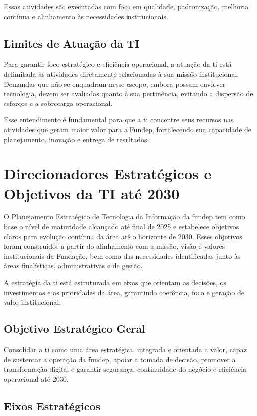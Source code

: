 \documentclass[12pt,a4paper]{article}
\begin{document}
Essas atividades são executadas com foco em qualidade, padronização, melhoria contínua e alinhamento às necessidades institucionais.

\subsection{Limites de Atuação da TI}

Para garantir foco estratégico e eficiência operacional, a atuação da \gls{ti} está delimitada às atividades diretamente relacionadas à sua missão institucional. Demandas que não se enquadram nesse escopo, embora possam envolver tecnologia, devem ser avaliadas quanto à sua pertinência, evitando a dispersão de esforços e a sobrecarga operacional.

Esse entendimento é fundamental para que a \gls{ti} concentre seus recursos nas atividades que geram maior valor para a Fundep, fortalecendo sua capacidade de planejamento, inovação e entrega de resultados.

\section{Direcionadores Estratégicos e Objetivos da TI até 2030}

O Planejamento Estratégico de Tecnologia da Informação da \gls{fundep} tem como base o nível de maturidade alcançado até final de 2025 e estabelece objetivos claros para evolução contínua da área até o horizonte de 2030. Esses objetivos foram construídos a partir do alinhamento com a missão, visão e valores institucionais da Fundação, bem como das necessidades identificadas junto às áreas finalísticas, administrativas e de gestão.

A estratégia da \gls{ti} está estruturada em eixos que orientam as decisões, os investimentos e as prioridades da área, garantindo coerência, foco e geração de valor institucional.

\subsection{Objetivo Estratégico Geral}

Consolidar a \gls{ti} como uma área estratégica, integrada e orientada a valor, capaz de sustentar a operação da \gls{fundep}, apoiar a tomada de decisão, promover a transformação digital e garantir segurança, continuidade do negócio e eficiência operacional até 2030.

\subsection{Eixos Estratégicos}
\end{document}
